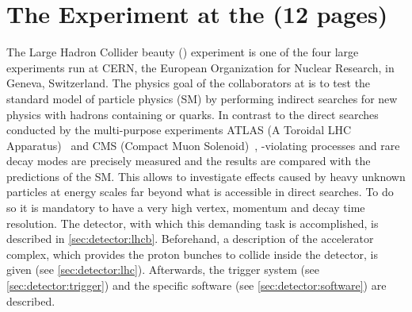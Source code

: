 
\chapter{The \lhcb Experiment at the \lhc (12 pages)}
\label{sec:Detector}

The Large Hadron Collider beauty (\lhcb) experiment is one of the four large
experiments run at CERN, the European Organization for Nuclear Research, in
Geneva, Switzerland. The physics goal of the collaborators at \lhcb is to test
the standard model of particle physics (SM) by performing indirect searches
for new physics with hadrons containing \bquark or \cquark quarks. In contrast
to the direct searches conducted by the multi-purpose experiments ATLAS (A
Toroidal LHC Apparatus)~\cite{ATLAS} and CMS (Compact Muon
Solenoid)~\cite{CMS}, \CP-violating processes and rare decay modes are
precisely measured and the results are compared with the predictions of the
SM. This allows to investigate effects caused by heavy unknown particles at
energy scales far beyond what is accessible in direct searches. To do so it is
mandatory to have a very high vertex, momentum and decay time resolution. The
detector, with which this demanding task is accomplished, is described in
\cref{sec:detector:lhcb}. Beforehand, a description of the accelerator
complex, which provides the proton bunches to collide inside the detector, is
given (see \cref{sec:detector:lhc}). Afterwards, the trigger system (see
\cref{sec:detector:trigger}) and the specific software (see
\cref{sec:detector:software}) are described.







